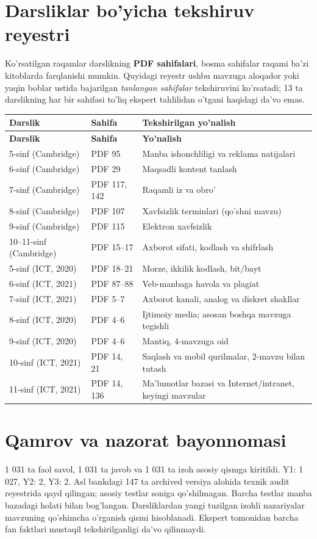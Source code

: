 \documentclass[10pt,a4paper,oneside]{article}
\begin{document}
\section{Darsliklar bo'yicha tekshiruv reyestri}
Ko'rsatilgan raqamlar darslikning \textbf{PDF sahifalari}, bosma sahifalar
raqami ba'zi kitoblarda farqlanishi mumkin. Quyidagi reyestr ushbu mavzuga
aloqador yoki yaqin boblar ustida bajarilgan \emph{tanlangan sahifalar}
tekshiruvini ko'rsatadi; 13 ta darslikning har bir sahifasi to'liq
ekspert tahlilidan o'tgani haqidagi da'vo emas.
\begin{longtable}{@{}p{60mm}p{21mm}p{75mm}@{}}
\toprule
\textbf{Darslik}&\textbf{Sahifa}&\textbf{Tekshirilgan yo'nalish}\\
\midrule\endfirsthead
\toprule \textbf{Darslik}&\textbf{Sahifa}&\textbf{Yo'nalish}\\\midrule\endhead
5-sinf (Cambridge) & PDF 95 & Manba ishonchliligi va reklama natijalari\\
6-sinf (Cambridge) & PDF 29 & Maqsadli kontent tanlash\\
7-sinf (Cambridge) & PDF 117, 142 & Raqamli iz va obro'\\
8-sinf (Cambridge) & PDF 107 & Xavfsizlik terminlari (qo'shni mavzu)\\
9-sinf (Cambridge) & PDF 115 & Elektron xavfsizlik\\
10--11-sinf (Cambridge) & PDF 15--17 & Axborot sifati, kodlash va shifrlash\\
5-sinf (ICT, 2020) & PDF 18--21 & Morze, ikkilik kodlash, bit/bayt\\
6-sinf (ICT, 2021) & PDF 87--88 & Veb-manbaga havola va plagiat\\
7-sinf (ICT, 2021) & PDF 5--7 & Axborot kanali, analog va diskret shakllar\\
8-sinf (ICT, 2020) & PDF 4--6 & Ijtimoiy media; asosan boshqa mavzuga tegishli\\
9-sinf (ICT, 2020) & PDF 4--6 & Mantiq, 4-mavzuga oid\\
10-sinf (ICT, 2021) & PDF 14, 21 & Saqlash va mobil qurilmalar, 2-mavzu bilan tutash\\
11-sinf (ICT, 2021) & PDF 14, 136 & Ma'lumotlar bazasi va Internet/intranet, keyingi mavzular\\
\bottomrule\end{longtable}
\section*{Qamrov va nazorat bayonnomasi}
1 031 ta faol savol, 1 031 ta javob va 1 031 ta izoh asosiy qismga kiritildi.
Y1: 1 027, Y2: 2, Y3: 2. Asl bankdagi 147 ta archived versiya
alohida texnik audit reyestrida qayd qilingan; asosiy testlar soniga qo'shilmagan.
Barcha testlar manba bazadagi holati bilan bog'langan.
Darsliklardan yangi tuzilgan izohli nazariyalar mavzuning qo'shimcha
o'rganish qismi hisoblanadi. Ekspert tomonidan barcha fan faktlari
mustaqil tekshirilganligi da'vo qilinmaydi.
\end{document}
